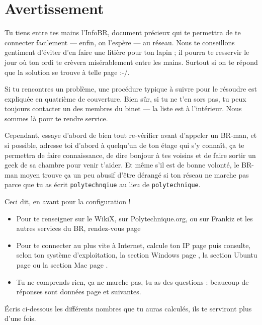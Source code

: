 \thispagestyle{empty}

\section*{Avertissement}

Tu tiens entre tes mains l'InfoBR, document pr\'ecieux qui te permettra de te connecter facilement
--- enfin, on l'esp\`ere --- au r\'eseau.
Nous te conseillons gentiment d'\'eviter d'en faire une liti\`ere pour ton lapin ; il pourra te resservir le jour o\`u ton ordi te cr\`evera mis\'erablement entre les
mains. Surtout si on te r\'epond que la solution se trouve \`a telle page :-/.

Si tu rencontres un probl\`eme, une proc\'edure typique \`a suivre pour le r\'esoudre est expliqu\'ee en quatri\`eme de couverture.
Bien sûr, si tu ne t'en sors pas, tu peux toujours contacter un des membres du binet --- la liste est \`a l'int\'erieur.
Nous sommes l\`a pour te rendre service.

Cependant, essaye d'abord de bien tout re-v\'erifier avant d'appeler un BR-man, et si possible, 
adresse toi d'abord \`a quelqu'un de ton \'etage qui s'y
connaît, ça te permettra de faire connaissance, de dire bonjour \`a tes voisins et 
de faire sortir un geek de sa chambre pour venir t'aider. 
Et m\^eme s'il est de bonne volont\'e, le BR-man moyen trouve ça un peu abusif d'\^etre d\'erang\'e si ton r\'eseau ne
marche pas parce que tu as \'ecrit \texttt{polytechnqiue} au lieu de \texttt{polytechnique}.

Ceci dit, en avant pour la configuration !

\vfill

\begin{itemize}
\item Pour te renseigner sur le WikiX, sur Polytechnique.org, ou sur Frankiz et les autres services du BR, rendez-vous page \pageref{services}
\item Pour te connecter au plus vite à Internet, calcule ton IP page \pageref{ip} puis consulte, selon ton système d'exploitation, la section Windows page \pageref{windows},
la section Ubuntu page \pageref{ubuntu} ou la section Mac page \pageref{mac}.
\item Tu ne comprends rien, ça ne marche pas, tu as des questions : beaucoup de réponses sont données page \pageref{faq} et suivantes.

\end{itemize}

\begin{center}
\'Ecris ci-dessous les différents nombres que tu auras calculés, ils te serviront plus d'une fois.
\end{center}

